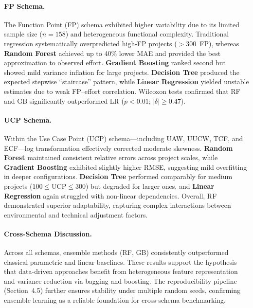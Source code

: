 \documentclass{ieeeaccess}
\begin{document}
\paragraph{FP Schema.}
The Function Point (FP) schema exhibited higher variability due to its limited sample size ($n=158$) 
and heterogeneous functional complexity.  
Traditional regression systematically overpredicted high-FP projects ($>300$~FP), 
whereas \textbf{Random Forest} achieved up to 40\% lower MAE and provided 
the best approximation to observed effort.  
\textbf{Gradient Boosting} ranked second but showed mild variance inflation for large projects.  
\textbf{Decision Tree} produced the expected stepwise ``staircase'' pattern, 
while \textbf{Linear Regression} yielded unstable estimates due to weak FP--effort correlation.  
Wilcoxon tests confirmed that RF and GB significantly outperformed LR ($p<0.01$; $|\delta|\ge0.47$).

\paragraph{UCP Schema.}
Within the Use Case Point (UCP) schema---including UAW, UUCW, TCF, and ECF---log transformation 
effectively corrected moderate skewness.  
\textbf{Random Forest} maintained consistent relative errors across project scales, 
while \textbf{Gradient Boosting} exhibited slightly higher RMSE, 
suggesting mild overfitting in deeper configurations.  
\textbf{Decision Tree} performed comparably for medium projects ($100\!\le\!\mathrm{UCP}\!\le\!300$) 
but degraded for larger ones, and \textbf{Linear Regression} again struggled with non-linear dependencies.  
Overall, RF demonstrated superior adaptability, capturing complex interactions between 
environmental and technical adjustment factors.

\paragraph{Cross-Schema Discussion.}
Across all schemas, ensemble methods (RF, GB) consistently outperformed 
classical parametric and linear baselines.  
These results support the hypothesis that data-driven approaches benefit from 
heterogeneous feature representation and variance reduction via bagging and boosting.  
The reproducibility pipeline (Section~4.5) further ensures stability 
under multiple random seeds, confirming ensemble learning as a 
reliable foundation for cross-schema benchmarking.
\end{document}
